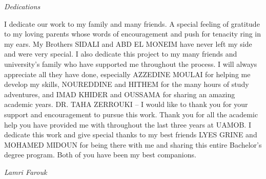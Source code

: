 \begin{center}
\Huge{\emph{Dedications}}
\end{center}

\vspace{1cm}

I dedicate our work to my family and many friends. A special feeling of gratitude to my loving parents whose words of encouragement and push for tenacity ring in my ears. My Brothers SIDALI and ABD EL MONEIM have never left my side and were very special.
I also dedicate this project to my many friends and university’s family who have supported me throughout the process. I will always appreciate all they have done, especially AZZEDINE MOULAI for helping me develop my skills, NOUREDDINE and HITHEM for the many hours of study adventures, and IMAD KHIDER and OUSSAMA for sharing an amazing academic years.
DR. TAHA ZERROUKI – I would like to thank you for your support and encouragement to pursue this work. Thank you for all the academic help you have provided me with throughout the last three years at UAMOB.
I dedicate this work and give special thanks to my best friends LYES GRINE and MOHAMED MIDOUN for being there with me and sharing this entire Bachelor's degree program. Both of you have been my best companions.

\vspace{3cm}
\begin{flushright}
	\textit{Lamri Farouk}
\end{flushright}